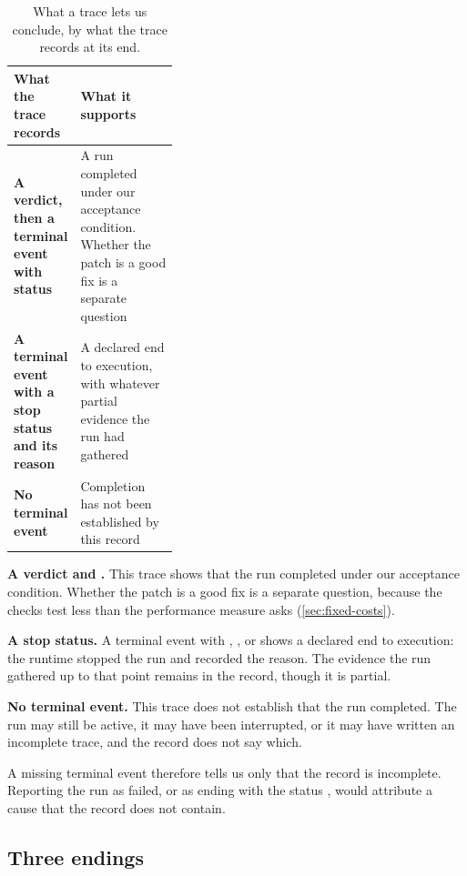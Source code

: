 \begin{table}[htbp]
  \centering
  \caption{What a trace lets us conclude, by what the trace records at its end.}
  \label{tab:control-conclude}
  \begin{adjustbox}{width=\linewidth}\begin{tabularx}{\linewidth}{@{}L{0.36\linewidth}X@{}}
    \toprule
    \textbf{What the trace records} & \textbf{What it supports} \\
    \midrule
    \textbf{A verdict, then a terminal event with status } & A run completed under
      our acceptance condition. Whether the patch is a good fix is a separate question \\
      \addlinespace
    \textbf{A terminal event with a stop status and its reason} & A declared end to execution, with
      whatever partial evidence the run had gathered \\ \addlinespace
    \textbf{No terminal event} & Completion has not been established by this record \\
    \bottomrule
  \end{tabularx}\end{adjustbox}
\end{table}

\bi
\item \textbf{A verdict and .} This trace shows that the run completed under our
acceptance condition. Whether the patch is a good fix is a separate question, because the checks
test less than the performance measure asks (\cref{sec:fixed-costs}).
\item \textbf{A stop status.} A terminal event with ,
,  or  shows a declared end to
execution: the runtime stopped the run and recorded the reason. The evidence the run gathered up to
that point remains in the record, though it is partial.
\item \textbf{No terminal event.} This trace does not establish that the run completed. The run may
still be active, it may have been interrupted, or it may have written an incomplete trace, and the
record does not say which.
\ei

A missing terminal event therefore tells us only that the record is incomplete. Reporting the run as
failed, or as ending with the status , would attribute a cause that the record does
not contain.

\subsection{Three endings}
\label{sec:control-endings}

